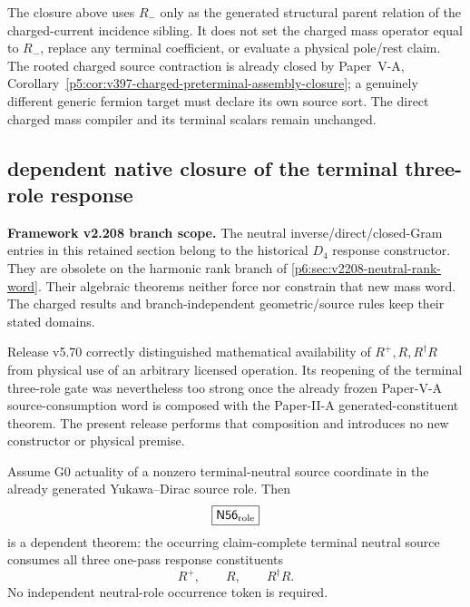 \documentclass[12pt,a4paper]{article}
\begin{document}
\begin{remark}
\label{p6:rem:v597-mass-incidence-firewall}
The closure above uses $R_-$ only as the generated structural parent relation
of the charged-current incidence sibling.  It does not set the charged mass
operator equal to $R_-$, replace any terminal coefficient, or evaluate a
physical pole/rest claim. The rooted charged source contraction is already
closed by Paper~V-A,
Corollary~\ref{p5:cor:v397-charged-preterminal-assembly-closure}; a genuinely
different generic fermion target must declare its own source sort.  The direct
charged mass compiler and its terminal scalars remain unchanged.
\end{remark}



\subsection{dependent native closure of the terminal three-role response}
\label{p6:sec:v574-n56-role-completion}

\noindent\textbf{Framework v2.208 branch scope.}
The neutral inverse/direct/closed-Gram entries in this retained section
belong to the historical $D_4$ response constructor. They are obsolete
on the harmonic rank branch of \ref{p6:sec:v2208-neutral-rank-word}.
Their algebraic theorems neither force nor constrain that new mass word.
The charged results and branch-independent geometric/source rules keep
their stated domains.


Release v5.70 correctly distinguished mathematical availability of
\(R^+,R,R^\dagger R\) from physical use of an arbitrary licensed operation.
Its reopening of the terminal three-role gate was nevertheless too strong once
the already frozen Paper-V-A source-consumption word is composed with the
Paper-II-A generated-constituent theorem.  The present release performs that
composition and introduces no new constructor or physical premise.

\begin{theorem}
\label{p6:thm:v574-n56-role-dependent-closure}
Assume G0 actuality of a nonzero terminal-neutral source coordinate in the
already generated Yukawa--Dirac source role.  Then
\[
 \boxed{\mathsf{N56}_{\rm role}}
\]
is a dependent theorem: the occurring claim-complete terminal neutral source
consumes all three one-pass response constituents
\[
 \boxed{R^+,\qquad R,\qquad R^\dagger R.}
\]
No independent neutral-role occurrence token is required.
\end{theorem}
\end{document}
